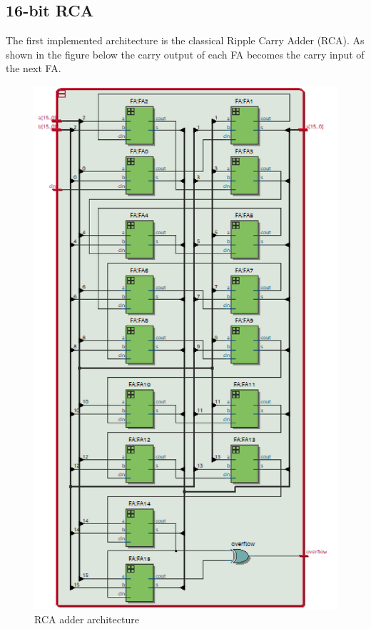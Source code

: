 \documentclass[12pt]{article}
\begin{document}
\subsection{16-bit RCA}

The first implemented architecture is the classical Ripple Carry Adder (RCA).
As shown in the figure below the carry output of each FA becomes the carry input of the next FA. 
 \begin{figure}[!h]
 	\centering
 	\includegraphics[scale = 0.6]{immagini/niki/rtl2_a.png}
 	\caption{RCA adder architecture}       
 \end{figure}
\end{document}
